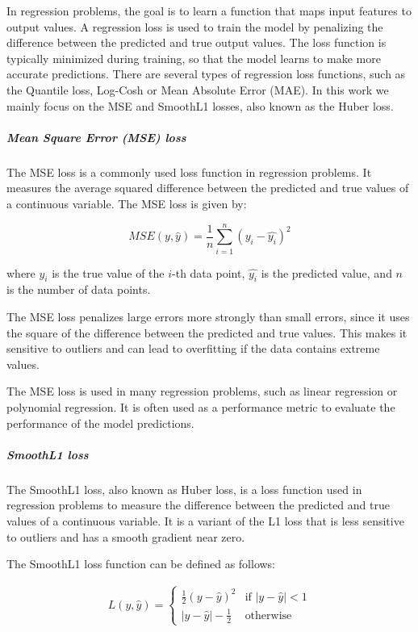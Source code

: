 In regression problems, the goal is to learn a function that maps input features to output values. A regression loss is used to train the model by penalizing the difference between the predicted and true output values. The loss function is typically minimized during training, so that the model learns to make more accurate predictions. There are several types of regression loss functions, such as the Quantile loss, Log-Cosh or Mean Absolute Error (MAE). In this work we mainly focus on the \ac{MSE} and SmoothL1 losses, also known as the Huber loss.

\subparagraph{Mean Square Error (MSE) loss}
\label{subpar:3_mse_loss}

The \acf{MSE} loss is a commonly used loss function in regression problems. It measures the average squared difference between the predicted and true values of a continuous variable. The \ac{MSE} loss is given by:

\begin{equation}
	MSE(y, \hat{y}) = \frac{1}{n}\sum_{i=1}^{n}(y_i - \hat{y_i})^2
\end{equation}

where $y_i$ is the true value of the $i$-th data point, $\hat{y_i}$ is the predicted value, and $n$ is the number of data points.

The \ac{MSE} loss penalizes large errors more strongly than small errors, since it uses the square of the difference between the predicted and true values. This makes it sensitive to outliers and can lead to overfitting if the data contains extreme values.

The MSE loss is used in many regression problems, such as linear regression or polynomial regression. It is often used as a performance metric to evaluate the performance of the model predictions.

\subparagraph{SmoothL1 loss}
\label{subpar:3_smoothL1_loss}

The SmoothL1 loss, also known as Huber loss, is a loss function used in regression problems to measure the difference between the predicted and true values of a continuous variable. It is a variant of the L1 loss that is less sensitive to outliers and has a smooth gradient near zero.

The SmoothL1 loss function can be defined as follows:

\begin{equation}
\begin{split}
	L(y, \hat{y}) = \begin{cases}
		\frac{1}{2}(y - \hat{y})^2 & \text{if } |y - \hat{y}| < 1 \\
		|y - \hat{y}| - \frac{1}{2} & \text{otherwise} \
	\end{cases}
\end{split}
\end{equation}

